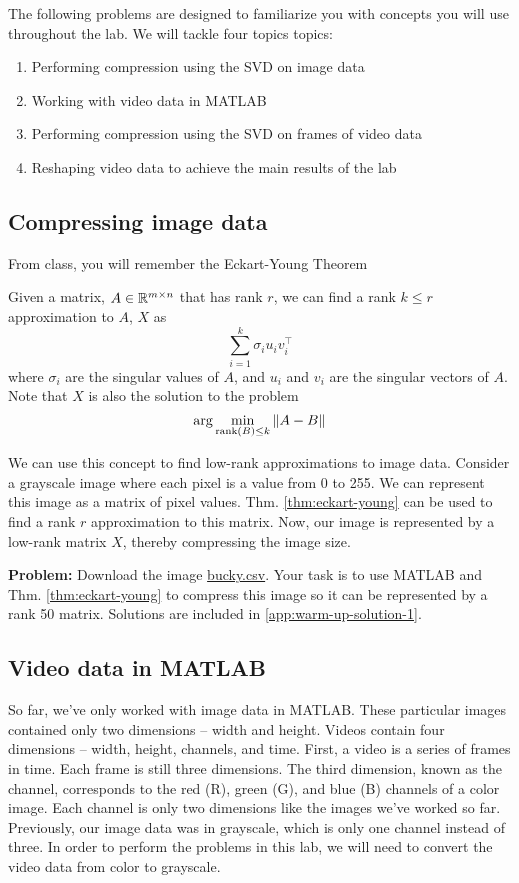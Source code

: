 The following problems are designed to familiarize you with concepts you will use throughout the lab. We will tackle four topics topics:
\begin{enumerate}
	\item Performing compression using the SVD on image data
	\item Working with video data in MATLAB
	\item Performing compression using the SVD on frames of video data
	\item Reshaping video data to achieve the main results of the lab
\end{enumerate}

\subsection{Compressing image data}
From class, you will remember the Eckart-Young Theorem
\begin{theorem}
	Given a matrix, $A \in \mathbb{R}^{m \times n}$ that has rank $r$, we can find a rank $k \leq r$ approximation to $A$, $X$ as
	$$\sum_{i = 1}^k \sigma_i u_i v_i^\top$$
	where $\sigma_i$ are the singular values of $A$, and $u_i$ and $v_i$ are the singular vectors of $A$. Note that $X$ is also the solution to the problem
	$$\arg \min_{\mathrm{rank}\left(B\right) \leq k} \|A - B\|$$
	\label{thm:eckart-young}
\end{theorem}
We can use this concept to find low-rank approximations to image data. Consider a grayscale image where each pixel is a value from 0 to 255. We can represent this image as a matrix of pixel values. Thm. \ref{thm:eckart-young} can be used to find a rank $r$ approximation to this matrix. Now, our image is represented by a low-rank matrix $X$, thereby compressing the image size.

\textbf{Problem:} Download the image \href{http://www.laurentlessard.com/teaching/ece532/homework/bucky.csv}{bucky.csv}. Your task is to use MATLAB and Thm. \ref{thm:eckart-young} to compress this image so it can be represented by a rank 50 matrix. Solutions are included in \ref{app:warm-up-solution-1}.

\subsection{Video data in MATLAB}
So far, we've only worked with image data in MATLAB. These particular images contained only two dimensions -- width and height. Videos contain four dimensions -- width, height, channels, and time. First, a video is a series of frames in time. Each frame is still three dimensions. The third dimension, known as the channel, corresponds to the red (R), green (G), and blue (B) channels of a color image. Each channel is only two dimensions like the images we've worked so far. Previously, our image data was in grayscale, which is only one channel instead of three. In order to perform the problems in this lab, we will need to convert the video data from color to grayscale.

